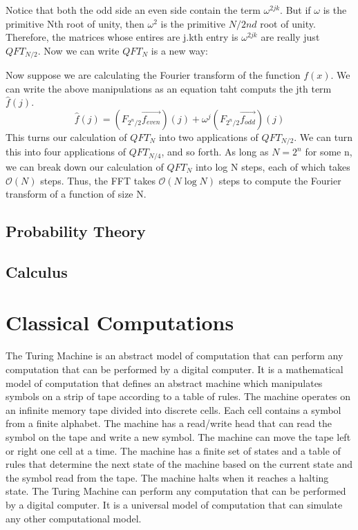 \documentclass[12pt, oneside]{book}
\theoremstyle{definition}
\theoremstyle{definition}
\theoremstyle{remark}
\begin{document}
Notice that both the odd side an even side contain the term $\omega^{2jk}$.
But if $\omega$ is the primitive Nth root of unity, then $\omega^2$ is the primitive $N/2nd $ root of unity.
Therefore, the matrices whose entires are j.kth entry is $\omega^{2jk}$ are really just $QFT_{N/2}$. Now we can write $QFT_N$ is a new way:

Now suppose we are calculating the Fourier transform of the function $f(x)$. We can write the above manipulations as an equation taht computs the jth term $\hat{f}(j)$.
\[
\hat{f}(j)=(F_{2^n/2}\vec{f_{even}})(j)+\omega^j(F_{2^n/2}\vec{f_{odd}})(j)
\]
This turns our calculation of $QFT_N$ into two applications of $QFT_{N/2}$. We can turn this into 
four applications of $QFT_{N/4}$, and so forth. As long as $N=2^n$ for some n, we can break down our calculation of 
$QFT_N$ into log N steps, each of which takes $\mathcal{O}(N)$ steps. Thus, the FFT takes $\mathcal{O}(N\log N)$ steps to compute the Fourier transform of a function of size N.



\newpage

\section{Probability Theory}





\section{Calculus}






\chapter{Classical Computations}
The Turing Machine is an abstract model of computation that can perform any computation that can be performed by a digital computer. It is a mathematical model of computation that defines an abstract machine which manipulates symbols on a strip of tape according to a table of rules.
The machine operates on an infinite memory tape divided into discrete cells. Each cell contains a symbol from a finite alphabet. The machine has a read/write head that can read the symbol on the tape and write a new symbol. The machine can move the tape left or right one cell at a time. The machine has a finite set of states and a table of rules that determine the next state of the machine based on the current state and the symbol read from the tape. The machine halts when it reaches a halting state. The Turing Machine can perform any computation that can be performed by a digital computer. It is a universal 
model of computation that can simulate any other computational model.
\end{document}
